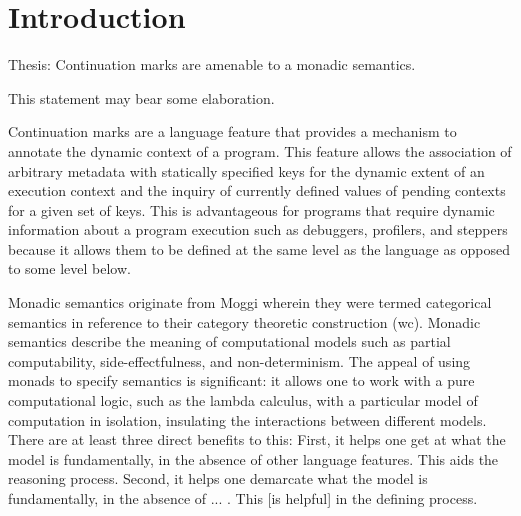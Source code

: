 \documentclass[ms]{byuprop}
\title{\Title}
\author{\Author}
\begin{document}
\maketitle



\section{Introduction}


Thesis: Continuation marks are amenable to a monadic semantics.

This statement may bear some elaboration. 

Continuation marks are a language feature that provides a mechanism to annotate the dynamic context of a program. This feature allows the association of arbitrary metadata with statically specified keys for the dynamic extent of an execution context and the inquiry of currently defined values of pending contexts for a given set of keys. This is advantageous for programs that require dynamic information about a program execution such as debuggers, profilers, and steppers because it allows them to be defined at the same level as the language as opposed to some level below.

Monadic semantics originate from Moggi \cite{moggi1989computational} wherein they were termed categorical semantics in reference to their category theoretic construction (wc). Monadic semantics describe the meaning of computational models such as partial computability, side-effectfulness, and non-determinism. The appeal of using monads to specify semantics is significant: it allows one to work with a pure computational logic, such as the lambda calculus, with a particular model of computation in isolation, insulating the interactions between different models. There are at least three direct benefits to this: First, it helps one get at what the model is fundamentally, in the absence of other language features. This aids the reasoning process. Second, it helps one demarcate what the model is fundamentally, in the absence of ... . This [is helpful] in the defining process.

\end{document}
